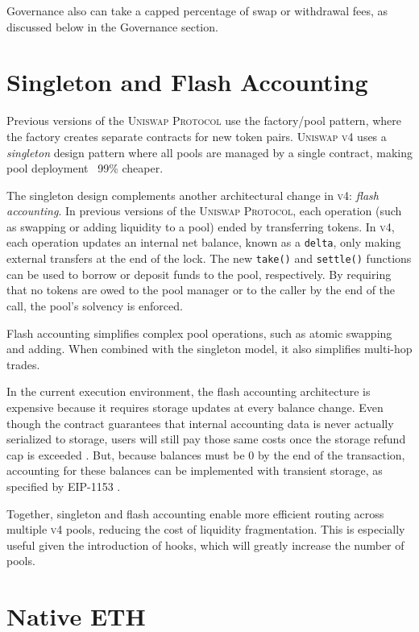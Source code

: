 \documentclass[sigconf,nonacm,prologue,table]{acmart}
\numberwithin{equation}{section}
\theoremstyle{definition}
\theoremstyle{remark}
\begin{document}
Governance also can take a capped percentage of swap or withdrawal fees, as discussed below in the Governance section. 

\section{Singleton and Flash Accounting} \label{flashaccounting}

Previous versions of the \textsc{Uniswap Protocol} use the factory/pool pattern, where the factory creates separate contracts for new token pairs. \textsc{Uniswap v4} uses a \emph{singleton} design pattern where all pools are managed by a single contract, making pool deployment ~99\% cheaper. 

The singleton design complements another architectural change in \textsc{v4}: \emph{flash accounting}. In previous versions of the \textsc{Uniswap Protocol}, each operation (such as swapping or adding liquidity to a pool) ended by transferring tokens. In \textsc{v4}, each operation updates an internal net balance, known as a \verb|delta|, only making external transfers at the end of the lock. The new \verb|take()| and  \verb|settle()| functions can be used to borrow or deposit funds to the pool, respectively. By requiring that no tokens are owed to the pool manager or to the caller by the end of the call, the pool's solvency is enforced. 

Flash accounting simplifies complex pool operations, such as atomic swapping and adding. When combined with the singleton model, it also simplifies multi-hop trades.

In the current execution environment, the flash accounting architecture is expensive because it requires storage updates at every balance change. Even though the contract guarantees that internal accounting data is never actually serialized to storage, users will still pay those same costs once the storage refund cap is exceeded \cite{Buterin2021}. But, because balances must be 0 by the end of the transaction, accounting for these balances can be implemented with transient storage, as specified by EIP-1153 \cite{Akhunov2018}.

Together, singleton and flash accounting enable more efficient routing across multiple \textsc{v4} pools, reducing the cost of liquidity fragmentation. This is especially useful given the introduction of hooks, which will greatly increase the number of pools. 

\section{Native ETH} 
\label{nativeeth}
\end{document}
